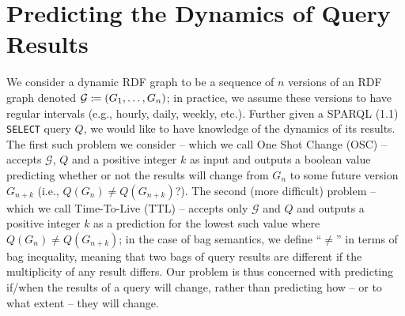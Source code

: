 \documentclass[runningheads]{llncs}
\newcommand{\da}{\ensuremath{:\nolinebreak\mkern-1.2mu\nolinebreak=}}
\begin{document}
%		
%		
%		
%		
%		
%		
%		
%		
%		
%
%	
%	
%	

\section{Predicting the Dynamics of Query Results}
\label{sec:approach}

We consider a dynamic RDF graph to be a sequence of $n$ versions of an RDF graph denoted $\mathcal{G} \da ( G_1, \ldots, G_n )$; in practice, we assume these versions to have regular intervals (e.g., hourly, daily, weekly, etc.). Further given a SPARQL (1.1) \texttt{SELECT} query $Q$, we would like to have knowledge of the dynamics of its results. The first such problem we consider -- which we call One Shot Change (OSC) -- accepts $\mathcal{G}$, $Q$ and a positive integer $k$ as input and outputs a boolean value predicting whether or not the results will change from $G_n$ to some future version $G_{n+k}$ (i.e., $Q(G_n) \neq Q(G_{n+k})$?). The second (more difficult) problem -- which we call Time-To-Live (TTL) -- accepts only $\mathcal{G}$ and $Q$ and outputs a positive integer $k$ as a prediction for the lowest such value where $Q(G_n) \neq Q(G_{n+k})$; in the case of bag semantics, we define ``$\neq$'' in terms of bag inequality, meaning that two bags of query results are different if the multiplicity of any result differs. Our problem is thus concerned with predicting if/when the results of a query will change, rather than predicting how  -- or to what extent -- they will change.
\end{document}
